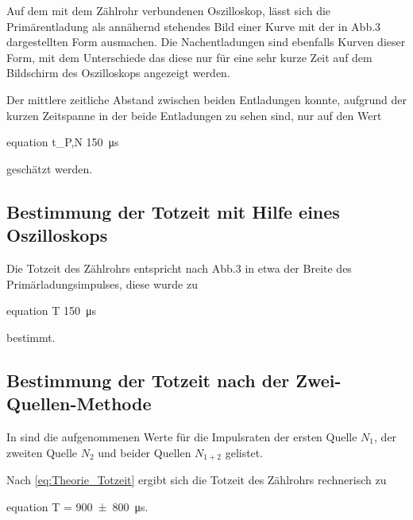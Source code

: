 	Auf dem mit dem Zählrohr verbundenen Oszilloskop, lässt sich die Primärentladung als 
	annähernd stehendes Bild einer Kurve mit der in Abb.3 \cite{V703} dargestellten Form 
	ausmachen. Die Nachentladungen sind ebenfalls Kurven dieser Form, mit dem Unterschiede
	das diese nur für eine sehr kurze Zeit auf dem Bildschirm des Oszilloskops angezeigt werden.
	
	Der mittlere zeitliche Abstand zwischen beiden Entladungen konnte, aufgrund der kurzen Zeitspanne 
	in der beide Entladungen zu sehen sind, nur auf den Wert
	\begin{empheq}{equation}
		\label{val:Primaer_Nachentladung_Oszilloskop}
		\Delta t_{P,N} \approx \SI{150}{\micro\second}
	\end{empheq} 
	geschätzt werden.
	 

\subsection{Bestimmung der Totzeit mit Hilfe eines Oszilloskops}

	Die Totzeit des Zählrohrs entspricht nach Abb.3 \cite{V703} in etwa der 
	Breite des Primärladungsimpulses, diese wurde zu
	\begin{empheq}{equation}
		\label{val:Totzeit_Oszilloskop}
		T \approx \SI{150}{\micro\second}
	\end{empheq} 
	bestimmt.
	

\subsection{Bestimmung der Totzeit nach der Zwei-Quellen-Methode}

	In sind die aufgenommenen Werte für die Impulsraten der ersten Quelle
	$N_{1}$, der zweiten Quelle $N_{2}$ und beider Quellen $N_{1+2}$ gelistet.
	
	

	Nach \cref{eq:Theorie_Totzeit} ergibt sich die Totzeit des Zählrohrs 
	rechnerisch zu 
	\begin{empheq}{equation}
		T = \SI{900(800)}{\micro\second}.
		\label{val:Totzeit_Berechnet}	
	\end{empheq}	
	
	
